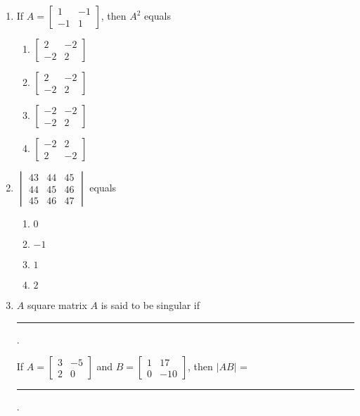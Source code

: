 \documentclass{article}
\begin{document}
\begin{enumerate}
    \item 
    If $A = \begin{bmatrix}
        1 & -1\\
        -1 & 1
    \end{bmatrix}$, then $A^2$ equals\\
    \begin{enumerate}
        \item $\begin{bmatrix}
            2 &-2\\
            -2 & 2
        \end{bmatrix}$
        \item $\begin{bmatrix}
            2 & -2\\
            -2 & 2
        \end{bmatrix}$
        \item $\begin{bmatrix}
            -2 & -2\\
            -2 & 2
        \end{bmatrix}$
        \item $\begin{bmatrix}
            -2 & 2\\
            2 & -2
        \end{bmatrix}$
    \end{enumerate}

    \item $\begin{vmatrix}
        43 & 44 & 45\\
        44 & 45 & 46\\
        45 & 46 &47
    \end{vmatrix}$ equals\\
    \begin{enumerate}
        \item $0$
        \item $-1$
        \item $1$
        \item $2$
    \end{enumerate}

    \item $A$ square matrix $A$ is said to be singular if \rule{2cm}{0.15mm}.

    If $A = \begin{bmatrix}
        3 & -5\\
        2 & 0
    \end{bmatrix}$ and 
    $B = \begin{bmatrix}
        1 & 17\\
        0 & -10
    \end{bmatrix}$, then $|AB|$ = \rule{2cm}{0.15mm}.


\end{enumerate}
\end{document}
